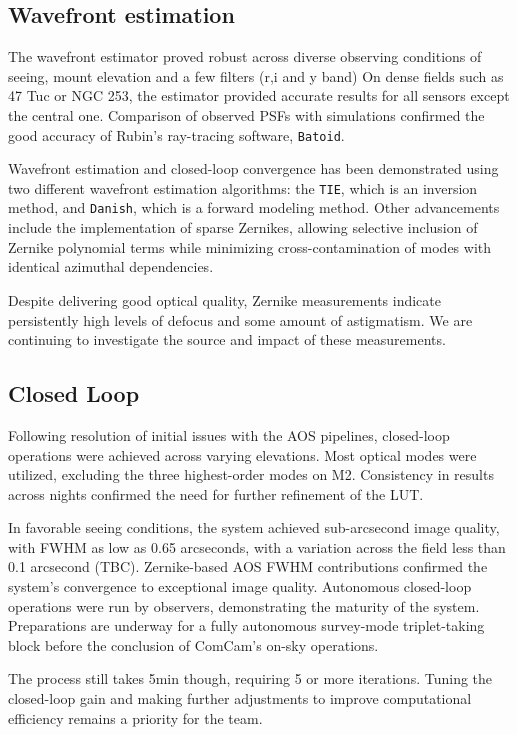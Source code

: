 \subsection{Wavefront estimation}
The wavefront estimator proved robust across diverse observing conditions of seeing, mount elevation and a few filters (r,i and y band) 
On dense fields such as 47 Tuc or NGC 253, the estimator provided accurate results for 
all sensors except the central one.  Comparison of observed PSFs with simulations 
confirmed the good accuracy of Rubin's ray-tracing software, \texttt{Batoid}.

Wavefront estimation and closed-loop convergence has been demonstrated using two different
wavefront estimation algorithms: the \texttt{TIE}, which is an inversion method, and \texttt{Danish}, which
is a forward modeling method. Other advancements include the implementation of sparse Zernikes, 
allowing selective inclusion of Zernike polynomial terms while minimizing cross-contamination 
of modes with identical azimuthal dependencies.

Despite delivering good optical quality, Zernike measurements indicate persistently high
levels of defocus and some amount of astigmatism. We are continuing to investigate the
source and impact of these measurements.

\subsection{Closed Loop}
Following resolution of initial issues with the AOS pipelines, 
closed-loop operations were achieved across varying elevations. 
Most optical modes were utilized, excluding the three highest-order modes on M2. 
Consistency in results across nights confirmed the need for further refinement of the LUT.

In favorable seeing conditions, the system achieved sub-arcsecond image 
quality, with FWHM as low as 0.65 arcseconds, with a variation across the field less than 0.1 arcsecond (TBC). Zernike-based AOS FWHM 
contributions confirmed the system's convergence to exceptional image 
quality. Autonomous closed-loop operations were run by observers, 
demonstrating the maturity of the system. Preparations are underway 
for a fully autonomous survey-mode triplet-taking block before the 
conclusion of ComCam's on-sky operations.

The process still takes 5min though, requiring 5 or more iterations. Tuning the closed-loop gain and making further adjustments to improve computational 
efficiency remains a priority for the team.

